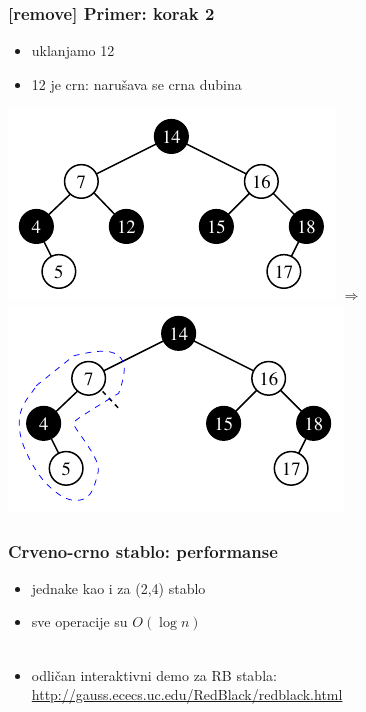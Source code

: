 \documentclass[compress]{beamer}
\begin{document}
\begin{frame}[fragile]
  \frametitle{[remove] Primer: korak 2}
  \begin{itemize}
    \item uklanjamo 12
    \item 12 je crn: narušava se crna dubina

  \end{itemize}
  \begin{center}
    \includegraphics[scale=0.8]{asp-11-del-02.pdf} $\Rightarrow$
    \includegraphics[scale=0.8]{asp-11-del-03.pdf}
  \end{center}
\end{frame}

\begin{frame}[fragile]
  \frametitle{Crveno-crno stablo: performanse}
  \begin{itemize}
    \item jednake kao i za (2,4) stablo
    \item sve operacije su $O(\log n)$ \\ \ \\
    \item odličan interaktivni demo za RB stabla: \\
    \url{http://gauss.ececs.uc.edu/RedBlack/redblack.html}
  \end{itemize}
\end{frame}
\end{document}
